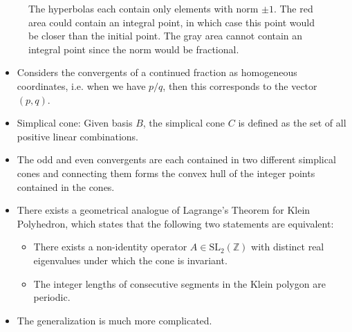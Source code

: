 \begin{figure}[b]
  \centering
  
  \caption{
    The hyperbolas each contain only elements with norm $±1$.
    The red area could contain an integral point, in which case this point
    would be closer than the initial point.
    The gray area cannot contain an integral point since the norm would be fractional.}
\end{figure}

\begin{itemize}
  \item Considers the convergents of a continued fraction as homogeneous coordinates,
    i.e. when we have $p / q$, then this corresponds to the vector $(p, q)$.
  \item Simplical cone: Given basis $B$, the simplical cone $C$ is defined as
    the set of all positive linear combinations.
  \item
    The odd and even convergents are each contained in two different simplical cones
    and connecting them forms the convex hull of the integer points contained in the cones.
  \item
    There exists a geometrical analogue of Lagrange's Theorem for Klein Polyhedron,
    which states that the following two statements are equivalent:
    \begin{itemize}
      \item
        There exists a non-identity operator $A ∈ \mathrm{SL}_2(ℤ)$ with
        distinct real eigenvalues under which the cone is invariant.
      \item
        The integer lengths of consecutive segments in the Klein polygon are periodic.
    \end{itemize}
  \item The generalization is much more complicated.
\end{itemize}


